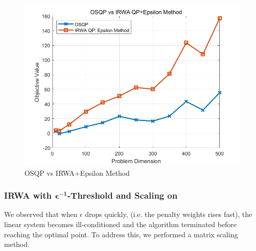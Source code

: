 \documentclass{article}
\begin{document}
\begin{figure}[H]
    \centering
    \includegraphics[width=0.75\linewidth]{fig/OSQP_vs_Epsilon_Method.png}
    \caption{OSQP vs IRWA+Epsilon Method}
    \label{fig: OSQP vs Epsilon Method}
\end{figure}


\subsubsection{IRWA with  \(\mathbf{\epsilon^{-1}}\)-Threshold and Scaling on}
We observed that when \(\epsilon\) drops quickly, (i.e. the penalty weights rises fast), the linear system becomes ill-conditioned and the algorithm terminated before reaching the optimal point. To address this, we performed a matrix scaling method.\cite{Stellato2020}

\end{document}
